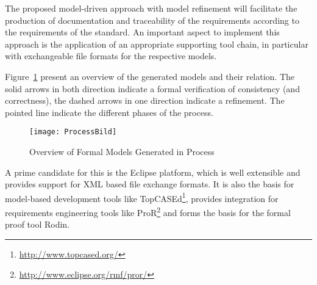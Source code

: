 The proposed model-driven approach with model refinement will facilitate the
production of documentation and traceability of the requirements according to
the requirements of the standard. An important aspect to implement this approach
is the application of an appropriate supporting tool chain, in particular with
exchangeable file formats for the respective models.

Figure~\ref{fig:overview-models-process} present an overview of the generated
models and their relation. The solid arrows in both direction indicate a formal
verification of consistency (and correctness), the dashed arrows in one
direction indicate a refinement. The pointed line indicate the different phases
of the process.

\begin{figure}[ht]
  \centering
  \texttt{[image: ProcessBild]}
  \caption{Overview of Formal Models Generated in Process}
  \label{fig:overview-models-process}
\end{figure}

A prime candidate for this is the Eclipse platform, which is well extensible and
provides support for XML based file exchange formats. It is also the basis for
model-based development tools like
TopCASEd\footnote{\url{http://www.topcased.org/}}, provides integration for
requirements engineering tools like
ProR\footnote{\url{http://www.eclipse.org/rmf/pror/}} and forms the basis for
the formal proof tool Rodin.


